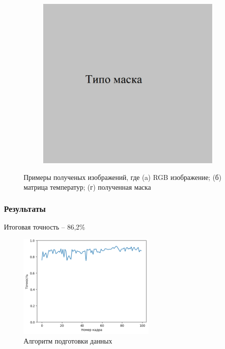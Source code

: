 \documentclass[t]{beamer}
\begin{document}
\begin{frame}
\begin{figure}[ht!]
\begin{subfigure}{.30\textwidth}
				\caption{}
			\end{subfigure}
			\begin{subfigure}{.30\textwidth}
				\centering
				\includegraphics[width = \textwidth]{image/mask}
				\caption{}
			\end{subfigure}
			\centering
			\caption{Примеры полученых изображений, где (a) RGB изображение; (б) матрица температур; (г) полученная маска}
			\label{fig:Examples}
		\end{figure}
	\end{frame}

	\begin{frame}
		\frametitle{Результаты}
		Итоговая точность -- 86,2\%
		\vspace*{0.65cm}
		\begin{figure}[h!]
			\centering
			\includegraphics[width = 0.6\textwidth]{image/accuracy_itog_plot}	
			\caption{Алгоритм подготовки данных}
			\label{fig:accuracy_itog_plot}
		\end{figure}
	\end{frame}
\end{document}
